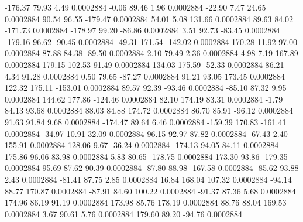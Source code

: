     -176.37       79.93        4.49     0.0002884
       -0.06       89.46        1.96     0.0002884
      -22.90        7.47       24.65     0.0002884
       90.54       96.55     -179.47     0.0002884
       54.01        5.08      131.66     0.0002884
       89.63       84.02     -171.73     0.0002884
     -178.97       99.20      -86.86     0.0002884
        3.51       92.73      -83.45     0.0002884
     -179.16       96.62      -90.45     0.0002884
      -49.31      171.54     -142.02     0.0002884
      170.28       11.92       97.00     0.0002884
       87.88       84.38      -89.50     0.0002884
        2.10       79.49        2.36     0.0002884
        4.98        7.19      167.89     0.0002884
      179.15      102.53       91.49     0.0002884
      134.03      175.59      -52.33     0.0002884
       86.21        4.34       91.28     0.0002884
        0.50       79.65      -87.27     0.0002884
       91.21       93.05      173.45     0.0002884
      122.32      175.11     -153.01     0.0002884
       89.57       92.39      -93.46     0.0002884
      -85.10       87.32        9.95     0.0002884
      144.62      177.86     -124.46     0.0002884
       82.10      174.19       83.31     0.0002884
       -1.79       84.13       93.68     0.0002884
       88.03       84.88      174.72     0.0002884
       86.70       85.91      -96.12     0.0002884
       91.63       91.84        9.68     0.0002884
     -174.47       89.64        6.46     0.0002884
     -159.39      170.83     -161.41     0.0002884
      -34.97       10.91       32.09     0.0002884
       96.15       92.97       87.82     0.0002884
      -67.43        2.40      155.91     0.0002884
      128.06        9.67      -36.24     0.0002884
     -174.13       94.05       84.11     0.0002884
      175.86       96.06       83.98     0.0002884
        5.83       80.65     -178.75     0.0002884
      173.30       93.86     -179.35     0.0002884
       95.69       87.62       90.39     0.0002884
      -87.80       88.98     -167.58     0.0002884
      -85.62       93.88        2.43     0.0002884
      -81.41       87.75        2.85     0.0002884
       16.84      168.04      107.32     0.0002884
      -94.14       88.77      170.87     0.0002884
      -87.91       84.60      100.22     0.0002884
      -91.37       87.36        5.68     0.0002884
      174.96       86.19       91.19     0.0002884
      173.98       85.76      178.19     0.0002884
       88.76       88.04      169.53     0.0002884
        3.67       90.61        5.76     0.0002884
      179.60       89.20      -94.76     0.0002884
